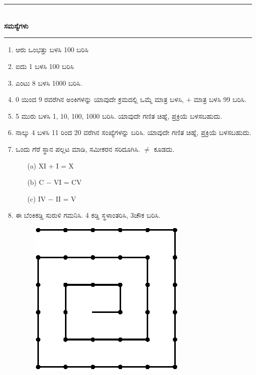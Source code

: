 \chapter[ಅಧ್ಯಾಯ 12]{}\label{chap12}

\begin{center}
\rule{5cm}{1pt}\\[5pt]
{\Large\bfseries ಸಮಸ್ಯೆಗಳು}\\[3pt]
\rule{5cm}{1pt}
\end{center}

\begin{enumerate}
\renewcommand{\labelenumi}{\bf\theenumi.}
\itemsep=5pt

\item ಆರು ಒಂಭತ್ತು ಬಳಸಿ 100 ಬರಿಸಿ 

\item ಐದು 1 ಬಳಸಿ 100 ಬರಿಸಿ

\item ಎಂಟು 8 ಬಳಸಿ 1000 ಬರಿಸಿ. 

\item 0 ಯಿಂದ 9 ರವರೆಗಿನ ಅಂಕಿಗಳನ್ನು ಯಾವುದೇ ಕ್ರಮದಲ್ಲಿ ಒಮ್ಮೆ ಮಾತ್ರ ಬಳಸಿ, $+$ ಮಾತ್ರ ಬಳಸಿ 99 ಬರಿಸಿ. 

\item 5 ಮುರು ಬಳಸಿ 1, 10, 100, 1000 ಬರಿಸಿ. ಯಾವುದೇ ಗಣಿತ ಚಿಹ್ನೆ, ಪ್ರಕ್ರಿಯೆ ಬಳಸಬಹುದು. 

\item ನಾಲ್ಕು 4 ಬಳಸಿ 11 ರಿಂದ 20 ವರೆಗಿನ ಸಂಖ್ಯೆಗಳನ್ನು ಬರಿಸಿ. ಯಾವುದೇ ಗಣಿತ ಚಿಹ್ನೆ, ಪ್ರಕ್ರಿಯೆ ಬಳಸಬಹುದು. 

\item ಒಂದು ಗೆರೆ ಸ್ಥಾನ ಪಲ್ಲಟ ಮಾಡಿ, ಸಮೀಕರನ ಸರಿದೂಗಿಸಿ. $\neq$ ಕೂಡದು. 
\begin{itemize}
\item[(a)] XI $+$ I = X
\item[(b)] C $-$ VI = CV
\item[(c)] IV $-$ II = V
\end{itemize}

\eject

\item ಈ ಬೆಂಕಿಕಡ್ಡಿ ಸುರುಳಿ ಗಮನಿಸಿ. 4 ಕಡ್ಡಿ ಸ್ಥಳಾಂತರಿಸಿ, 3ಚೌಕ ಬರಿಸಿ. 
\begin{figure}[H]
\centering
\includegraphics{images/chap12/q8.eps}
\end{figure}


\end{enumerate}
